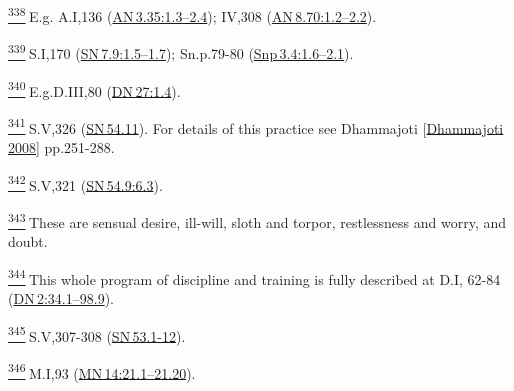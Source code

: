 \label{footprints_split_024.html_fn338}
\hyperref[footprints_split_011.htmlux5cux23fnref338]{\textsuperscript{338}} E.g.
A.I,136
(\href{https://suttacentral.net/an3.35/en/sujato\#1.3}{AN\,3.35:1.3--2.4});
IV,308
(\href{https://suttacentral.net/an8.70/en/sujato\#1.2}{AN\,8.70:1.2--2.2}).

\label{footprints_split_024.html_fn339}
\hyperref[footprints_split_011.htmlux5cux23fnref339]{\textsuperscript{339}} S.I,170
(\href{https://suttacentral.net/sn7.9/en/sujato\#1.5}{SN\,7.9:1.5--1.7});
Sn.p.79-80
(\href{https://suttacentral.net/snp3.4/en/sujato\#1.6}{Snp\,3.4:1.6--2.1}).

\label{footprints_split_024.html_fn340}
\hyperref[footprints_split_011.htmlux5cux23fnref340]{\textsuperscript{340}} E.g.D.III,80
(\href{https://suttacentral.net/dn27/en/sujato\#1.4}{DN\,27:1.4}).

\label{footprints_split_024.html_fn341}
\hyperref[footprints_split_011.htmlux5cux23fnref341]{\textsuperscript{341}} S.V,326
(\href{https://suttacentral.net/sn54.11/en/sujato}{SN\,54.11}). For
details of this practice see {Dhammajoti
{{[}\hyperref[footprints_split_022.htmlux5cux23Dhammajotiux5cux25202008]{Dhammajoti
2008}{]}}} pp.251-288.

\label{footprints_split_024.html_fn342}
\hyperref[footprints_split_011.htmlux5cux23fnref342]{\textsuperscript{342}} S.V,321
(\href{https://suttacentral.net/sn54.9/en/sujato\#6.3}{SN\,54.9:6.3}).

\label{footprints_split_024.html_fn343}
\hyperref[footprints_split_011.htmlux5cux23fnref343]{\textsuperscript{343}} These
are sensual desire, ill-will, sloth and torpor, restlessness and worry,
and doubt.

\label{footprints_split_024.html_fn344}
\hyperref[footprints_split_011.htmlux5cux23fnref344]{\textsuperscript{344}} This
whole program of discipline and training is fully described at D.I,
62-84
(\href{https://suttacentral.net/dn2/en/sujato\#34.1}{DN\,2:34.1--98.9}).

\label{footprints_split_024.html_fn345}
\hyperref[footprints_split_011.htmlux5cux23fnref345]{\textsuperscript{345}} S.V,307-308
(\href{https://suttacentral.net/sn53.1-12/en/sujato}{SN\,53.1-12}).

\label{footprints_split_024.html_fn346}
\hyperref[footprints_split_011.htmlux5cux23fnref346]{\textsuperscript{346}} M.I,93
(\href{https://suttacentral.net/mn14/en/sujato\#21.1}{MN\,14:21.1--21.20}).

